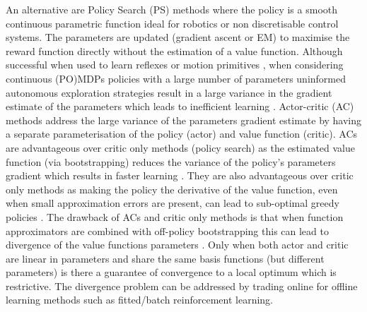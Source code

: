\documentclass[final,5p,times,twocolumn]{elsarticle}
\begin{document}
An alternative are Policy Search (PS) methods \cite{p_search_surv_2011} where the policy is a smooth continuous
parametric function ideal for robotics or non discretisable control systems. The parameters are updated (gradient ascent or EM) 
to maximise the reward function directly without the estimation of a value function. Although successful 
when used to learn reflexes or motion primitives \cite{Kormushev2010Humanoids,Calinon2013369}, when considering continuous (PO)MDPs policies
with a large number of parameters uninformed autonomous exploration strategies  result in a large variance in the gradient estimate of the parameters 
which leads to inefficient learning \cite{rl_ac_surv_2012}.
Actor-critic (AC) methods \cite[Chap. 6.6]{sutton1998reinforcement} address 
the large variance of the parameters gradient estimate by having a separate parameterisation of the policy (actor) and value function 
(critic). ACs are advantageous over critic only methods (policy search) as the estimated value function (via bootstrapping) reduces the variance of 
the policy's parameters gradient which results in faster learning \cite{rl_ac_surv_2012}. They are also advantageous over critic only methods as 
making the policy the derivative of the value function, even when small approximation errors are present, can lead 
to sub-optimal greedy policies \cite{Baxter_GPOMDP_2000}. The drawback of ACs and critic only methods is that when function approximators 
are combined with off-policy bootstrapping this can lead to divergence of the value functions parameters \cite{Baird95}. Only when both actor 
and critic are linear in parameters and share the same basis functions (but different parameters) is there a guarantee 
of convergence \cite{Sutton00policygradient} to a local optimum which is restrictive. The divergence problem can be 
addressed by trading online for offline learning methods such as fitted/batch reinforcement learning.

\end{document}

